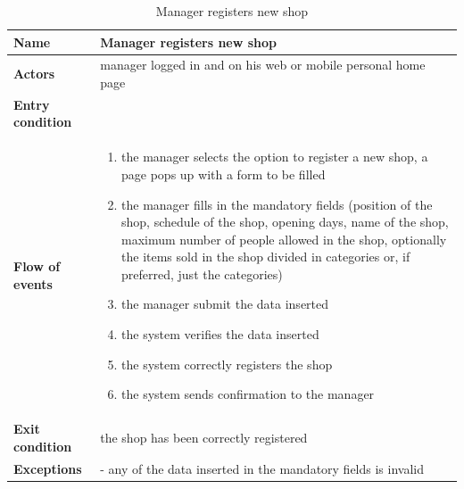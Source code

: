 \begin{table}[h!]
    \centering
    \begin{tabular}{@{}P{0.2\textwidth}P{0.70\textwidth}@{}}
        \toprule
        \textbf{Name}                 & Manager registers new shop\\
        \midrule
        \textbf{Actors}               & manager logged in and on his web or mobile personal home page\\
        \textbf{Entry condition}      & \\
        \textbf{Flow of events}       & 
        \begin{enumerate}[nolistsep, leftmargin=*]
            \item the manager selects the option to register a new shop, a page pops up with a form to be filled
            \item  the manager fills in the mandatory fields (position of the shop, schedule of the shop, opening days, name of the shop, maximum number of people allowed in the shop, optionally the items sold in the shop divided in categories or, if preferred, just the categories)
            \item the manager submit the data inserted
            \item the system verifies the data inserted
            \item the system correctly registers the shop
            \item the system sends confirmation to the manager
        \end{enumerate} \\
        \textbf{Exit condition}       & the shop has been correctly registered\\
        \textbf{Exceptions}           
        & - any of the data inserted in the mandatory fields is invalid\\
        \bottomrule
    \end{tabular}
\caption{Manager registers new shop}
\label{table:managerregisternewshop}
\end{table}

